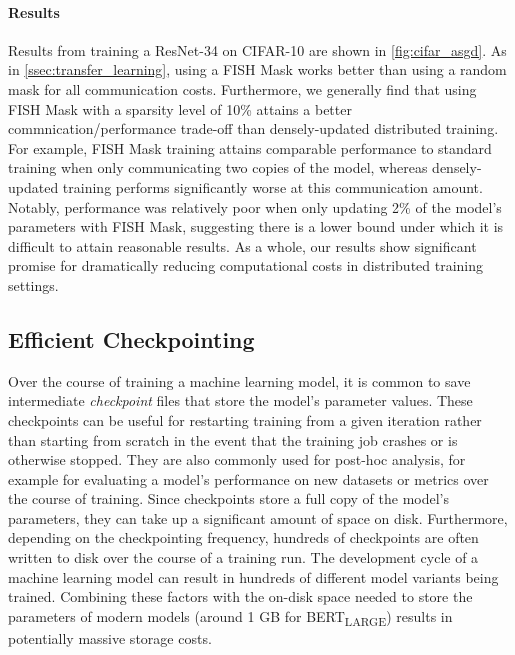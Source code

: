 \paragraph{Results}

Results from training a ResNet-34 on CIFAR-10 are shown in \ref{fig:cifar_asgd}.
As in \ref{ssec:transfer_learning}, using a FISH Mask works better than using a random mask for all communication costs. Furthermore, we generally find that using FISH Mask with a sparsity level of 10\% attains a better commnication/performance trade-off than densely-updated distributed training. For example, FISH Mask training attains comparable performance to standard training when only communicating two copies of the model, whereas densely-updated training performs significantly worse at this communication amount. Notably, performance was relatively poor when only updating 2\% of the model's parameters with FISH Mask, suggesting there is a lower bound under which it is difficult to attain reasonable results. As a whole, our results show significant promise for dramatically reducing computational costs in distributed training settings.

\subsection{Efficient Checkpointing} \label{ssec:efficient checkpointing}

Over the course of training a machine learning model, it is common to save intermediate \textit{checkpoint} files that store the model's parameter values. These checkpoints can be useful for restarting training from a given iteration rather than starting from scratch in the event that the training job crashes or is otherwise stopped. They are also commonly used for post-hoc analysis, for example for evaluating a model's performance on new datasets or metrics over the course of training. Since checkpoints store a full copy of the model's parameters, they can take up a significant amount of space on disk. Furthermore, depending on the checkpointing frequency, hundreds of checkpoints are often written to disk over the course of a training run. The development cycle of a machine learning model can result in hundreds of different model variants being trained. Combining these factors with the on-disk space needed to store the parameters of modern models (around 1 GB for BERT\textsubscript{LARGE}) results in potentially massive storage costs.

